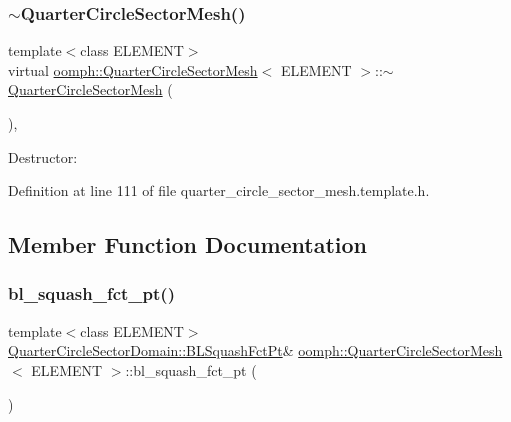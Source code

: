 \subsubsection{\texorpdfstring{$\sim$\+Quarter\+Circle\+Sector\+Mesh()}{~QuarterCircleSectorMesh()}}
{\footnotesize\ttfamily template$<$class E\+L\+E\+M\+E\+NT$>$ \\
virtual \hyperlink{classoomph_1_1QuarterCircleSectorMesh}{oomph\+::\+Quarter\+Circle\+Sector\+Mesh}$<$ E\+L\+E\+M\+E\+NT $>$\+::$\sim$\hyperlink{classoomph_1_1QuarterCircleSectorMesh}{Quarter\+Circle\+Sector\+Mesh} (\begin{DoxyParamCaption}{ }\end{DoxyParamCaption})\hspace{0.3cm}{\ttfamily [inline]}, {\ttfamily [virtual]}}



Destructor\+: 



Definition at line 111 of file quarter\+\_\+circle\+\_\+sector\+\_\+mesh.\+template.\+h.



\subsection{Member Function Documentation}
\mbox{\label{classoomph_1_1QuarterCircleSectorMesh_a6f149022d7a40bd0efed49adacd716bf}} 
\subsubsection{\texorpdfstring{bl\+\_\+squash\+\_\+fct\+\_\+pt()}{bl\_squash\_fct\_pt()}}
{\footnotesize\ttfamily template$<$class E\+L\+E\+M\+E\+NT$>$ \\
\hyperlink{classoomph_1_1QuarterCircleSectorDomain_a6cffab57f87c9f4ab01744647240bb1e}{Quarter\+Circle\+Sector\+Domain\+::\+B\+L\+Squash\+Fct\+Pt}\& \hyperlink{classoomph_1_1QuarterCircleSectorMesh}{oomph\+::\+Quarter\+Circle\+Sector\+Mesh}$<$ E\+L\+E\+M\+E\+NT $>$\+::bl\+\_\+squash\+\_\+fct\+\_\+pt (\begin{DoxyParamCaption}{ }\end{DoxyParamCaption})\hspace{0.3cm}{\ttfamily [inline]}}




